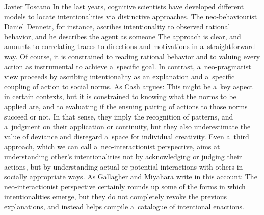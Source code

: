 \begin{artengenv}{Javier Toscano}
In the last years, cognitive scientists have developed different models to locate intentionalities via distinctive approaches. The neo-behaviourist Daniel Dennett, for instance, ascribes intentionality to observed rational behavior, and he describes the agent as someone 
 The approach is clear, and amounts to correlating traces to directions and motivations in a~straightforward way. Of course, it is constrained to reading rational behavior and to valuing every action as instrumental to achieve a~specific goal. In contrast, a~neo-pragmatist view 
\parencites[][]{brandom_making_1994}[][]{brandom_articulating_2000}[][]{cash_thoughts_2008}[][]{cash_normativity_2009} %
 proceeds by ascribing intentionality as an explanation and a~specific coupling of action to social norms. As Cash 
\parencite*[][p.101]{cash_thoughts_2008} %
 argues:
  This might be a~key aspect in certain contexts, but it is constrained to knowing what the norms to be applied are, and to evaluating if the ensuing pairing of actions to those norms succeed or not. In that sense, they imply the recognition of patterns, and a~judgment on their application or continuity, but they also underestimate the value of deviance and disregard a~space for individual creativity. Even a~third approach, which we can call a~neo-interactionist perspective, aims at understanding other's intentionalities not by acknowledging or judging their actions, but by understanding actual or potential interactions with others in socially appropriate ways. As Gallagher and Miyahara 
\parencite*[][p.135]{gallagher_neo-pragmatism_2012} %
 write in this account: 
 The neo-interactionist perspective certainly rounds up some of the forms in which intentionalities emerge, but they do not completely revoke the previous explanations, and instead helps compile a~catalogue of intentional enactions.


\end{artengenv}
